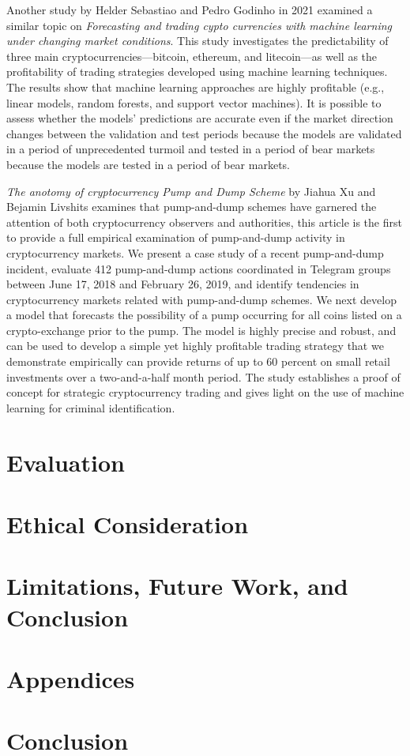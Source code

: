 \documentclass[10pt,twocolumn]{article}
\begin{document}
Another study by Helder Sebastiao and Pedro Godinho in 2021 examined a similar topic on \textit{Forecasting and trading cypto currencies with machine learning under changing market conditions}. This study investigates the predictability of three main cryptocurrencies—bitcoin, ethereum, and litecoin—as well as the profitability of trading strategies developed using machine learning techniques. The results show that machine learning approaches are highly profitable (e.g., linear models, random forests, and support vector machines). It is possible to assess whether the models' predictions are accurate even if the market direction changes between the validation and test periods because the models are validated in a period of unprecedented turmoil and tested in a period of bear markets because the models are tested in a period of bear markets.

\textit{The anotomy of cryptocurrency Pump and Dump Scheme} by Jiahua Xu and Bejamin Livshits examines that pump-and-dump schemes have garnered the attention of both cryptocurrency observers and authorities, this article is the first to provide a full empirical examination of pump-and-dump activity in cryptocurrency markets. We present a case study of a recent pump-and-dump incident, evaluate 412 pump-and-dump actions coordinated in Telegram groups between June 17, 2018 and February 26, 2019, and identify tendencies in cryptocurrency markets related with pump-and-dump schemes. We next develop a model that forecasts the possibility of a pump occurring for all coins listed on a crypto-exchange prior to the pump. The model is highly precise and robust, and can be used to develop a simple yet highly profitable trading strategy that we demonstrate empirically can provide returns of up to 60 percent on small retail investments over a two-and-a-half month period. The study establishes a proof of concept for strategic cryptocurrency trading and gives light on the use of machine learning for criminal identification.

\section{Evaluation}

\section{Ethical Consideration}

\section{Limitations, Future Work, and Conclusion}

\section{Appendices}

\section{Conclusion}

\printbibliography 
\end{document}
